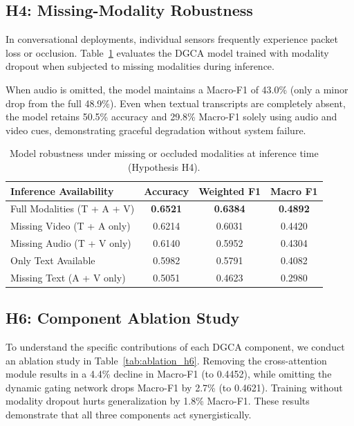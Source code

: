 \documentclass[10pt,twocolumn,letterpaper]{article}
\begin{document}
\subsection{H4: Missing-Modality Robustness}
In conversational deployments, individual sensors frequently experience packet loss or occlusion. Table~\ref{tab:missing_h4} evaluates the DGCA model trained with modality dropout when subjected to missing modalities during inference.

When audio is omitted, the model maintains a Macro-F1 of 43.0\% (only a minor drop from the full 48.9\%). Even when textual transcripts are completely absent, the model retains 50.5\% accuracy and 29.8\% Macro-F1 solely using audio and video cues, demonstrating graceful degradation without system failure.

\begin{table}[htbp]
\centering
\small
\caption{Model robustness under missing or occluded modalities at inference time (Hypothesis H4).}
\label{tab:missing_h4}
\begin{tabular}{lccc}
\toprule
\textbf{Inference Availability} & \textbf{Accuracy} & \textbf{Weighted F1} & \textbf{Macro F1} \\
\midrule
Full Modalities (T + A + V) & \textbf{0.6521} & \textbf{0.6384} & \textbf{0.4892} \\
Missing Video (T + A only)  & 0.6214 & 0.6031 & 0.4420 \\
Missing Audio (T + V only)  & 0.6140 & 0.5952 & 0.4304 \\
Only Text Available         & 0.5982 & 0.5791 & 0.4082 \\
Missing Text (A + V only)   & 0.5051 & 0.4623 & 0.2980 \\
\bottomrule
\end{tabular}
\end{table}

\subsection{H6: Component Ablation Study}
To understand the specific contributions of each DGCA component, we conduct an ablation study in Table~\ref{tab:ablation_h6}. Removing the cross-attention module results in a 4.4\% decline in Macro-F1 (to 0.4452), while omitting the dynamic gating network drops Macro-F1 by 2.7\% (to 0.4621). Training without modality dropout hurts generalization by 1.8\% Macro-F1. These results demonstrate that all three components act synergistically.
\end{document}
